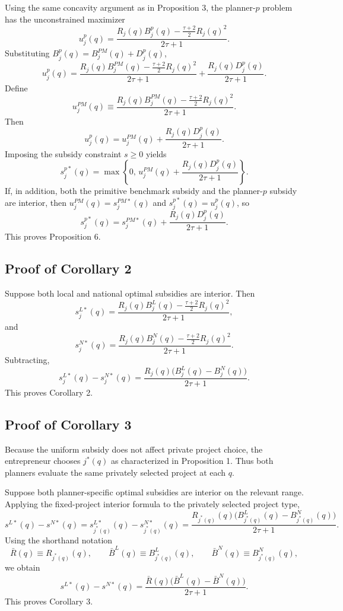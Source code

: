Using the same concavity argument as in Proposition 3, the planner-\(p\) problem has the unconstrained
maximizer
\[
u_j^p(q)
=
\frac{R_j(q)B_j^p(q)-\frac{\tau+2}{2}R_j(q)^2}{2\tau+1}.
\]
Substituting \(B_j^p(q)=B_j^{PM}(q)+D_j^p(q)\),
\[
u_j^p(q)
=
\frac{R_j(q)B_j^{PM}(q)-\frac{\tau+2}{2}R_j(q)^2}{2\tau+1}
+
\frac{R_j(q)D_j^p(q)}{2\tau+1}.
\]
Define
\[
u_j^{PM}(q)
\equiv
\frac{R_j(q)B_j^{PM}(q)-\frac{\tau+2}{2}R_j(q)^2}{2\tau+1}.
\]
Then
\[
u_j^p(q)=u_j^{PM}(q)+\frac{R_j(q)D_j^p(q)}{2\tau+1}.
\]
Imposing the subsidy constraint \(s\ge 0\) yields
\[
s_j^{p*}(q)
=
\max\left\{
0,\,
u_j^{PM}(q)+\frac{R_j(q)D_j^p(q)}{2\tau+1}
\right\}.
\]
If, in addition, both the primitive benchmark subsidy and the planner-\(p\) subsidy are interior, then
\(u_j^{PM}(q)=s_j^{PM*}(q)\) and \(s_j^{p*}(q)=u_j^p(q)\), so
\[
s_j^{p*}(q)
=
s_j^{PM*}(q)
+
\frac{R_j(q)D_j^p(q)}{2\tau+1}.
\]
This proves Proposition 6.

\subsection{Proof of Corollary 2}

Suppose both local and national optimal subsidies are interior. Then
\[
s_j^{L*}(q)
=
\frac{R_j(q)B_j^L(q)-\frac{\tau+2}{2}R_j(q)^2}{2\tau+1},
\]
and
\[
s_j^{N*}(q)
=
\frac{R_j(q)B_j^N(q)-\frac{\tau+2}{2}R_j(q)^2}{2\tau+1}.
\]
Subtracting,
\[
s_j^{L*}(q)-s_j^{N*}(q)
=
\frac{R_j(q)\bigl(B_j^L(q)-B_j^N(q)\bigr)}{2\tau+1}.
\]
This proves Corollary 2.

\subsection{Proof of Corollary 3}

Because the uniform subsidy does not affect private project choice, the entrepreneur chooses
\(j^*(q)\) as characterized in Proposition 1. Thus both planners evaluate the same privately selected
project at each \(q\).

Suppose both planner-specific optimal subsidies are interior on the relevant range. Applying the
fixed-project interior formula to the privately selected project type,
\[
s^{L*}(q)-s^{N*}(q)
=
s_{j^*(q)}^{L*}(q)-s_{j^*(q)}^{N*}(q)
=
\frac{R_{j^*(q)}(q)\bigl(B_{j^*(q)}^L(q)-B_{j^*(q)}^N(q)\bigr)}{2\tau+1}.
\]
Using the shorthand notation
\[
\bar R(q)\equiv R_{j^*(q)}(q),
\qquad
\bar B^L(q)\equiv B_{j^*(q)}^L(q),
\qquad
\bar B^N(q)\equiv B_{j^*(q)}^N(q),
\]
we obtain
\[
s^{L*}(q)-s^{N*}(q)
=
\frac{\bar R(q)\bigl(\bar B^L(q)-\bar B^N(q)\bigr)}{2\tau+1}.
\]
This proves Corollary 3.

